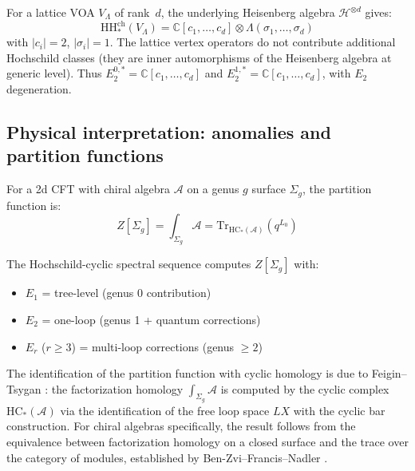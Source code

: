 \begin{example}
\label{ex:E2-lattice}
For a lattice VOA $V_\Lambda$ of rank~$d$, the underlying Heisenberg
algebra $\mathcal{H}^{\otimes d}$ gives:
\[\mathrm{HH}_*^{\mathrm{ch}}(V_\Lambda) = \mathbb{C}[c_1, \ldots, c_d]
\otimes \Lambda(\sigma_1, \ldots, \sigma_d)\]
with $|c_i| = 2$, $|\sigma_i| = 1$.  The lattice vertex operators do not
contribute additional Hochschild classes (they are inner automorphisms of the
Heisenberg algebra at generic level).  Thus
$E_2^{0,*} = \mathbb{C}[c_1, \ldots, c_d]$
and $E_2^{1,*} = \mathbb{C}[c_1, \ldots, c_d]$, with
$E_2$ degeneration.
\end{example}

\subsection{Physical interpretation: anomalies and partition functions}

\begin{theorem}
\label{thm:partition-cyclic}
For a 2d CFT with chiral algebra $\mathcal{A}$ on a genus $g$ surface $\Sigma_g$,
the partition function is:
\[Z[\Sigma_g] = \int_{\Sigma_g} \mathcal{A} = \mathrm{Tr}_{\mathrm{HC}_*(\mathcal{A})}(q^{L_0})\]

The Hochschild-cyclic spectral sequence computes $Z[\Sigma_g]$ with:
\begin{itemize}
\item $E_1$ = tree-level (genus 0 contribution)
\item $E_2$ = one-loop (genus 1 + quantum corrections)
\item $E_r$ ($r \geq 3$) = multi-loop corrections (genus $\geq 2$)
\end{itemize}
\end{theorem}

\begin{remark}[Provenance]
The identification of the partition function with cyclic homology is due to Feigin--Tsygan \cite{FT87}: the factorization homology $\int_{\Sigma_g} \mathcal{A}$ is computed by the cyclic complex $\mathrm{HC}_*(\mathcal{A})$ via the identification of the free loop space $LX$ with the cyclic bar construction. For chiral algebras specifically, the result follows from the equivalence between factorization homology on a closed surface and the trace over the category of modules, established by Ben-Zvi--Francis--Nadler \cite{BZFN10}.
\end{remark}

